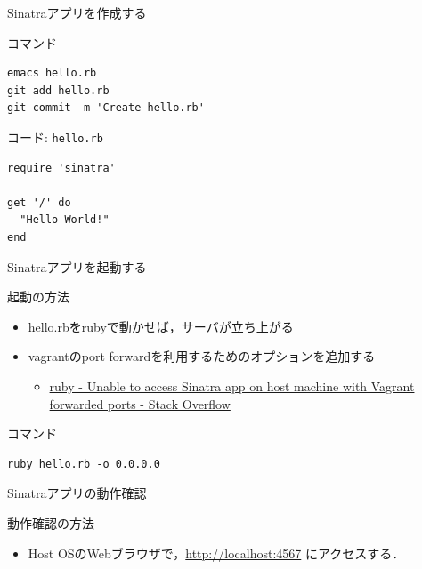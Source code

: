 \documentclass[t, aspectratio=169]{beamer}
\begin{document}
\begin{frame}[fragile,label=sec-5-1-3]{Sinatraアプリを作成する}
 \begin{block}{コマンド}
\begin{verbatim}
emacs hello.rb
git add hello.rb
git commit -m 'Create hello.rb'
\end{verbatim}
\end{block}
\begin{block}{コード: \texttt{hello.rb}}
\begin{verbatim}
require 'sinatra'

get '/' do
  "Hello World!"
end
\end{verbatim}
\end{block}
\end{frame}
\begin{frame}[fragile,label=sec-5-1-4]{Sinatraアプリを起動する}
 \begin{block}{起動の方法}
\begin{itemize}
\item hello.rbをrubyで動かせば，サーバが立ち上がる
\item vagrantのport forwardを利用するためのオプションを追加する
\begin{itemize}
\item \href{http://stackoverflow.com/questions/21250885/unable-to-access-sinatra-app-on-host-machine-with-vagrant-forwarded-ports}{ruby - Unable to access Sinatra app on host machine with Vagrant forwarded ports - Stack Overflow}
\end{itemize}
\end{itemize}
\end{block}
\begin{block}{コマンド}
\begin{verbatim}
ruby hello.rb -o 0.0.0.0
\end{verbatim}
\end{block}
\end{frame}
\begin{frame}[label=sec-5-1-5]{Sinatraアプリの動作確認}
\begin{block}{動作確認の方法}
\begin{itemize}
\item Host OSのWebブラウザで，\url{http://localhost:4567} にアクセスする．
\end{itemize}
\end{block}
\end{frame}
\end{document}
